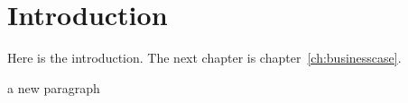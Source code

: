 \chapter{Introduction}\label{ch:introduction}
Here is the introduction. The next chapter is chapter~\ref{ch:businesscase}.


a new paragraph